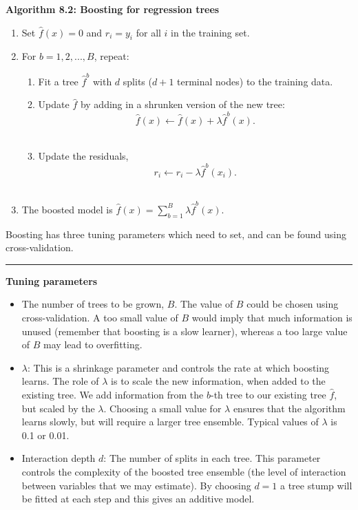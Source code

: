 \documentclass[]{article}
\providecommand{\tightlist}{%
  \setlength{\itemsep}{0pt}\setlength{\parskip}{0pt}}
\begin{document}
\textbf{Algorithm 8.2: Boosting for regression trees}

\begin{enumerate}
\def\labelenumi{\arabic{enumi}.}
\tightlist
\item
  Set \(\hat{f}(x) = 0\) and \(r_i = y_i\) for all \(i\) in the training
  set.
\item
  For \(b=1,2,...,B\), repeat:

  \begin{enumerate}
  \def\labelenumii{\alph{enumii})}
  \tightlist
  \item
    Fit a tree \(\hat{f}^b\) with \(d\) splits (\(d+1\) terminal nodes)
    to the training data.\\
  \item
    Update \(\hat{f}\) by adding in a shrunken version of the new tree:
    \[\hat{f}(x) \leftarrow \hat{f}(x)+\lambda \hat{f}^b(x).\]\\
  \item
    Update the residuals,
    \[r_i \leftarrow r_i - \lambda \hat{f}^b(x_i).\]\\
  \end{enumerate}
\item
  The boosted model is
  \(\hat{f}(x) = \sum_{b=1}^B \lambda \hat{f}^b(x).\)
\end{enumerate}

Boosting has three tuning parameters which need to set, and can be found
using cross-validation.

\begin{center}\rule{0.5\linewidth}{\linethickness}\end{center}

\textbf{Tuning parameters}

\begin{itemize}
\tightlist
\item
  The number of trees to be grown, \(B\). The value of \(B\) could be
  chosen using cross-validation. A too small value of \(B\) would imply
  that much information is unused (remember that boosting is a slow
  learner), whereas a too large value of \(B\) may lead to overfitting.
\item
  \(\lambda\): This is a shrinkage parameter and controls the rate at
  which boosting learns. The role of \(\lambda\) is to scale the new
  information, when added to the existing tree. We add information from
  the \(b\)-th tree to our existing tree \(\hat{f}\), but scaled by the
  \(\lambda\). Choosing a small value for \(\lambda\) ensures that the
  algorithm learns slowly, but will require a larger tree ensemble.
  Typical values of \(\lambda\) is 0.1 or 0.01.
\item
  Interaction depth \(d\): The number of splits in each tree. This
  parameter controls the complexity of the boosted tree ensemble (the
  level of interaction between variables that we may estimate). By
  choosing \(d=1\) a tree stump will be fitted at each step and this
  gives an additive model.
\end{itemize}
\end{document}
